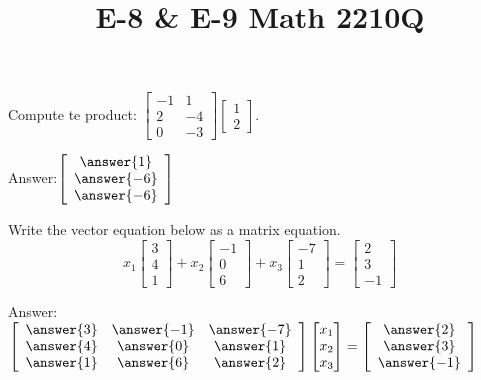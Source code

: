 \documentclass{ximera}
\begin{document}
  	\title{E-8 \& E-9  \hfill Math 2210Q} 

  	
  
 

  	 	\begin{question}
  
  	Compute te product: $	\begin{bmatrix}
  			-1 &1\\2&-4\\0 &-3
  		\end{bmatrix} \begin{bmatrix}
  		1 \\2
  		\end{bmatrix}$.
  		
  		Answer:$ \left[\begin{array}{c}
  	\answer{1}\\\answer{-6}\\ \answer{-6}
  		\end{array}\right]$
  	
  		\end{question}
  		
  		\begin{question} Write the vector equation below as a matrix equation.\\
  	$$x_1\begin{bmatrix}
  	3\\4\\1
  	\end{bmatrix} +x_2 \begin{bmatrix}
  	-1\\0\\6
  	\end{bmatrix}+x_3\begin{bmatrix}
  -7\\1\\2
  	\end{bmatrix} =\begin{bmatrix}
  2\\3\\-1
  	\end{bmatrix}$$
  	
  	Answer: $\left[ \begin{array}{ccc} \answer{3} & \answer{-1} & \answer{-7} \\
  	\answer{4} & \answer{0} & \answer{1} \\ \answer{1} & \answer{6} & \answer{2} \\ \end{array} \right] \begin{bmatrix} x_1\\ x_2\\ x_3 \end{bmatrix} = \left[ \begin{array}{c} \answer{2}\\ \answer{3}\\ \answer{-1} \end{array} \right]$
  	
  		
  	\end{question}
  	
\end{document}

